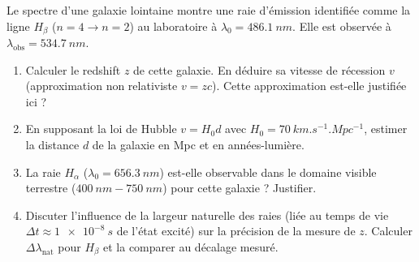\documentclass[11pt]{article}
\begin{document}
\begin{exercice}
Le spectre d'une galaxie lointaine montre une raie d'émission identifiée comme la ligne $H_\beta$ ($n=4 \to n=2$) au laboratoire à $\lambda_0 = \SI{486,1}{nm}$. Elle est observée à $\lambda_{\text{obs}} = \SI{534,7}{nm}$.
\begin{enumerate}
    \item Calculer le redshift $z$ de cette galaxie. En déduire sa vitesse de récession $v$ (approximation non relativiste $v = zc$). Cette approximation est-elle justifiée ici ?
    \item En supposant la loi de Hubble $v = H_0 d$ avec $H_0 = \SI{70}{km.s^{-1}.Mpc^{-1}}$, estimer la distance $d$ de la galaxie en Mpc et en années-lumière.
    \item La raie $H_\alpha$ ($\lambda_0 = \SI{656,3}{nm}$) est-elle observable dans le domaine visible terrestre ($\SI{400}{nm} - \SI{750}{nm}$) pour cette galaxie ? Justifier.
    \item Discuter l'influence de la largeur naturelle des raies (liée au temps de vie $\Delta t \approx \SI{1e-8}{s}$ de l'état excité) sur la précision de la mesure de $z$. Calculer $\Delta \lambda_{\text{nat}}$ pour $H_\beta$ et la comparer au décalage mesuré.
\end{enumerate}
\end{exercice}
\end{document}
